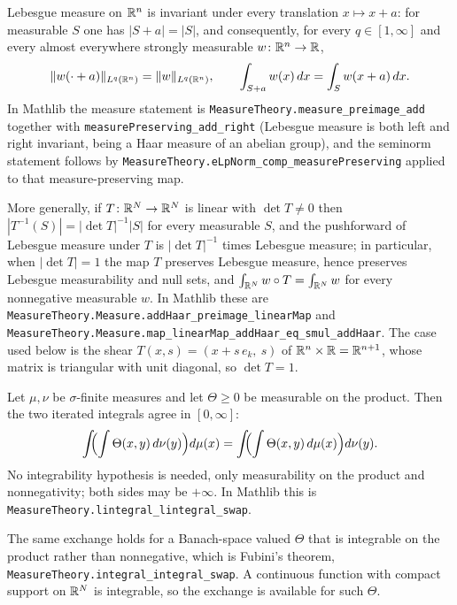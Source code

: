 \begin{proposition}
Lebesgue measure on $\mathbb{R}^n$ is invariant under every translation
$x\mapsto x+a$: for measurable $S$ one has $|S+a|=|S|$, and consequently, for
every $q\in[1,\infty]$ and every almost everywhere strongly measurable
$w\colon\mathbb{R}^n\to\mathbb{R}$,
\[
\|w(\cdot+a)\|_{L^{q}(\mathbb{R}^n)}=\|w\|_{L^{q}(\mathbb{R}^n)} ,
\qquad
\int_{S+a}w(x)\,dx=\int_{S}w(x+a)\,dx .
\]
In Mathlib the measure statement is
\texttt{MeasureTheory.measure\_preimage\_add} together with
\texttt{measurePreserving\_add\_right} (Lebesgue measure is both left and right
invariant, being a Haar measure of an abelian group), and the seminorm statement
follows by \texttt{MeasureTheory.eLpNorm\_comp\_measurePreserving} applied to
that measure-preserving map.

More generally, if $T\colon\mathbb{R}^N\to\mathbb{R}^N$ is linear with $\det T\ne0$ then
$|T^{-1}(S)|=|\det T|^{-1}|S|$ for every measurable $S$, and the pushforward of
Lebesgue measure under $T$ is $|\det T|^{-1}$ times Lebesgue measure; in
particular, when $|\det T|=1$ the map $T$ preserves Lebesgue measure, hence
preserves Lebesgue measurability and null sets, and
$\int_{\mathbb{R}^N}w\circ T=\int_{\mathbb{R}^N}w$ for every nonnegative measurable $w$.  In
Mathlib these are
\texttt{MeasureTheory.Measure.addHaar\_preimage\_linearMap} and
\texttt{MeasureTheory.Measure.map\_linearMap\_addHaar\_eq\_smul\_addHaar}.  The
case used below is the shear $T(x,s)=(x+s\,e_k,\ s)$ of
$\mathbb{R}^n\times\mathbb{R}=\mathbb{R}^{n+1}$, whose matrix is triangular with unit diagonal, so
$\det T=1$.
\end{proposition}

\begin{proposition}
Let $\mu,\nu$ be $\sigma$-finite measures and let $\Theta\ge0$ be measurable on
the product.  Then the two iterated integrals agree in $[0,\infty]$:
\[
\int\!\!\Bigl(\int\Theta(x,y)\,d\nu(y)\Bigr)d\mu(x)
=\int\!\!\Bigl(\int\Theta(x,y)\,d\mu(x)\Bigr)d\nu(y) .
\]
No integrability hypothesis is needed, only measurability on the product and
nonnegativity; both sides may be $+\infty$.  In Mathlib this is
\texttt{MeasureTheory.lintegral\_lintegral\_swap}.

The same exchange holds for a Banach-space valued $\Theta$ that is integrable on
the product rather than nonnegative, which is Fubini's theorem,
\texttt{MeasureTheory.integral\_integral\_swap}.  A continuous function with
compact support on $\mathbb{R}^N$ is integrable, so the exchange is available for such
$\Theta$.
\end{proposition}

